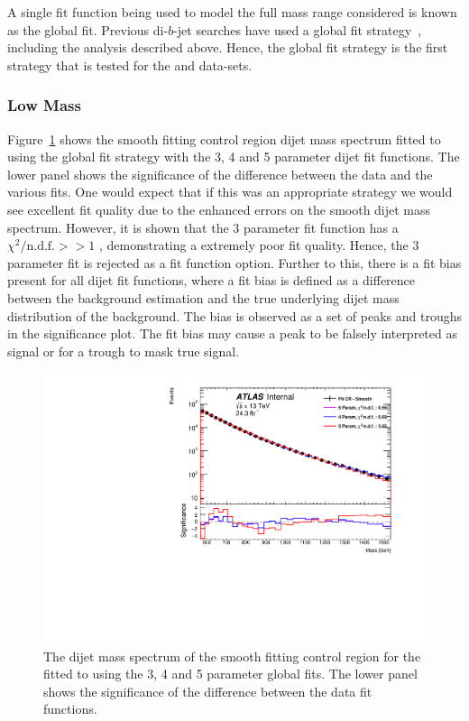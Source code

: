 A single fit function being used to model the full mass range considered is known as the global fit.
Previous di-$b$-jet searches have used a global fit strategy~\cite{dibjet-mori16_paper}, including the \summer{} analysis described above.
Hence, the global fit strategy is the first strategy that is tested for the \lm{} and \hm{} data-sets.

\subsubsection{Low Mass}
\label{sec:lowmass_globalFit}

Figure~\ref{fig:lowmass_globalFit} shows the smooth fitting control region dijet mass spectrum fitted to
using the global fit strategy with the 3, 4 and 5 parameter dijet fit functions.
The lower panel shows the significance of the difference between the data and the various fits.
One would expect that if this was an appropriate strategy we would see excellent fit quality due to the enhanced errors on the smooth dijet mass spectrum.
However, it is shown that the 3 parameter fit function has a $\chi^{2}/\text{n.d.f.} >> 1$ , demonstrating a extremely poor fit quality.
Hence, the 3 parameter fit is rejected as a fit function option.
Further to this, there is a fit bias present for all dijet fit functions,
where a fit bias is defined as a difference between the background estimation and the true underlying dijet mass distribution of the background.
The bias is observed as a set of peaks and troughs in the significance plot.
The fit bias may cause a peak to be falsely interpreted as signal or for a trough to mask true signal. 

\begin{figure}[!htb]
\centering
\includegraphics[scale=0.5, angle=0]{figs/Dibjet/LowMass/FitStudy_min566/globalFit_lm_dH.pdf}
\vspace{10pt}
\caption{\label{fig:lowmass_globalFit}
  The dijet mass spectrum of the smooth fitting control region for the \lm{}
  fitted to using the 3, 4 and 5 parameter global fits.
  The lower panel shows the significance of the difference between the data fit functions.}
\end{figure}

